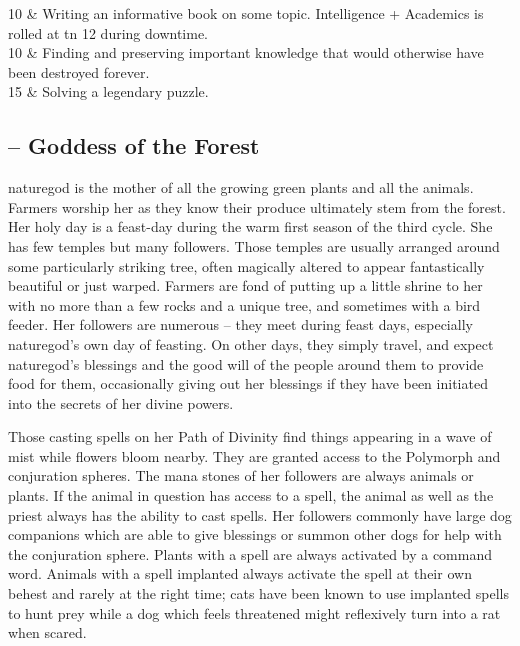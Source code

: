 \begin{multicols}{2}
\begin{xpchart}{}
	10 & Writing an informative book on some topic. Intelligence + Academics is rolled at \gls{tn} 12 during downtime. \\

	10 & Finding and preserving important knowledge that would otherwise have been destroyed forever. \\

	15 & Solving a legendary puzzle. \\

\end{xpchart}

\subsection{ -- Goddess of the Forest}

\noindent
\Gls{naturegod} is the mother of all the growing green plants and all the animals.
Farmers worship her as they know their produce ultimately stem from the forest.
Her holy day is a feast-day during the warm first season of the third cycle.
She has few temples but many followers.
Those temples are usually arranged around some particularly striking tree, often magically altered to appear fantastically beautiful or just warped.
Farmers are fond of putting up a little shrine to her with no more than a few rocks and a unique tree, and sometimes with a bird feeder.
Her followers are numerous -- they meet during feast days, especially \gls{naturegod}'s own day of feasting.
On other days, they simply travel, and expect \gls{naturegod}'s blessings and the good will of the people around them to provide food for them, occasionally giving out her blessings if they have been initiated into the secrets of her divine powers.

Those casting spells on her Path of Divinity find things appearing in a wave of mist while flowers bloom nearby.
They are granted access to the Polymorph and conjuration spheres.
The mana stones of her followers are always animals or plants.
If the animal in question has access to a spell, the animal as well as the priest always has the ability to cast spells.
Her followers commonly have large dog companions which are able to give blessings or summon other dogs for help with the conjuration sphere.
Plants with a spell are always activated by a command word.
Animals with a spell implanted always activate the spell at their own behest and rarely at the right time; cats have been known to use implanted spells to hunt prey while a dog which feels threatened might reflexively turn into a rat when scared.


\end{multicols}
